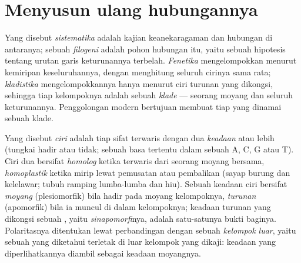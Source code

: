 \section{Menyusun ulang hubungannya}

\begin{definition}\label{def:b1:classifying-biodiversity:systematics}
Yang disebut \emph{sistematika} adalah kajian keanekaragaman 
dan hubungan di antaranya; sebuah \emph{filogeni} adalah pohon
hubungan itu, yaitu sebuah hipotesis tentang urutan garis keturunannya
terbelah. \emph{Fenetika} mengelompokkan  menurut kemiripan
keseluruhannya, dengan menghitung seluruh cirinya sama rata;
\emph{kladistika} mengelompokkannya hanya menurut ciri turunan yang
dikongsi, sehingga tiap kelompoknya adalah sebuah \emph{klade} ---
seorang moyang dan seluruh keturunannya. Penggolongan modern
bertujuan membuat tiap  yang dinamai sebuah klade.
\end{definition}

\begin{definition}\label{def:b1:classifying-biodiversity:characters}
Yang disebut \emph{ciri} adalah tiap sifat terwaris dengan dua
\emph{keadaan} atau lebih (tungkai hadir atau tidak; sebuah basa
tertentu dalam sebuah  A, C, G atau T). Ciri dua  bersifat
\emph{homolog} ketika terwaris dari seorang moyang bersama,
\emph{homoplastik} ketika mirip lewat pemusatan atau pembalikan (sayap
burung dan kelelawar; tubuh ramping lumba-lumba dan hiu). Sebuah
keadaan ciri bersifat \emph{moyang} (plesiomorfik) bila hadir pada
moyang kelompoknya, \emph{turunan} (apomorfik) bila ia muncul di dalam
kelompoknya; keadaan turunan yang dikongsi sebuah , yaitu
\emph{sinapomorfi}nya, adalah satu-satunya bukti baginya. Polaritasnya
ditentukan lewat perbandingan dengan sebuah \emph{kelompok luar},
yaitu sebuah  yang diketahui terletak di luar kelompok yang
dikaji: keadaan yang diperlihatkannya diambil sebagai keadaan
moyangnya.
\end{definition}

